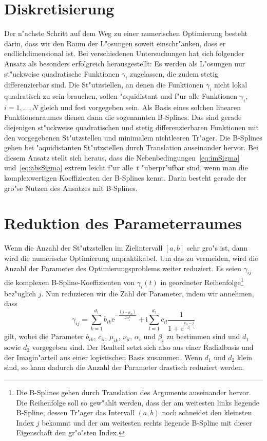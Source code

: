 \documentclass[a4paper]{scrartcl}
\newcommand{\ee}{{\mathrm{e}}}
\newcommand{\ii}{{\mathrm{i}}}
\begin{document}
\section{Diskretisierung}

Der n"achste Schritt auf dem Weg zu einer numerischen Optimierung besteht darin, dass wir den Raum der L"osungen soweit einschr"anken, dass er endlichdimensional ist. 
Bei verschiedenen Untersuchungen hat sich folgender Ansatz als besonders erfolgreich herausgestellt: 
Es werden als L"osungen nur st"uckweise quadratische Funktionen $\gamma_i$ zugelassen, die zudem stetig differenzierbar sind. 
Die St"utzstellen, an denen die Funktionen $\gamma_i$ nicht lokal quadratisch zu sein brauchen, sollen "aquidistant und f"ur alle Funktionen $\gamma_i$, $i=1,\ldots,N$ gleich und fest vorgegeben sein. 
Als Basis eines solchen linearen Funktionenraumes dienen dann die sogenannten B-Splines. 
Das sind gerade diejenigen st"uckweise quadratischen und stetig differenzierbaren Funktionen mit den vorgegebenen St"utzstellen und minimalem nichtleeren Tr"ager. 
Die B-Splines gehen bei "aquidistanten St"utzstellen durch Translation auseinander hervor. 
Bei diesem Ansatz stellt sich heraus, dass die Nebenbedingungen~\eqref{eq:imSigma} und~\eqref{eq:absSigma} extrem leicht f"ur alle~$t$ "uberpr"ufbar sind, wenn man die komplexwertigen Koeffizienten der B-Splines kennt. 
Darin besteht gerade der gro"se Nutzen des Ansatzes mit B-Splines.


\section{Reduktion des Parameterraumes}

Wenn die Anzahl der St"utzstellen im Zielintervall $[a,b]$ sehr gro"s ist, dann wird die numerische Optimierung unpraktikabel. 
Um das zu vermeiden, wird die Anzahl der Parameter des Optimierungsproblems weiter reduziert. 
Es seien $\gamma_{ij}$ die komplexen B-Spline-Koeffizienten von $\gamma_i(t)$ in geordneter Reihenfolge\footnote{Die B-Splines gehen durch Translation des Arguments auseinander hervor. Die Reihenfolge soll so gew"ahlt werden, dass der am weitesten links liegende B-Spline, dessen Tr"ager das Intervall $(a,b)$ noch schneidet den kleinsten Index $j$ bekommt und der am weitesten rechts liegende B-Spline mit dieser Eigenschaft den gr"o"sten Index.} bez"uglich $j$. Nun reduzieren wir die Zahl der Parameter, indem wir annehmen, dass 
$$ \gamma_{ij} = \sum_{k=1}^{d_1}b_{ik}\ee^{-\frac{(j-\mu_{ik})}{2\alpha_i^2}} + \ii\sum_{l=1}^{d_2}c_{il}\frac{1}{1+\ee^\frac{\nu_{il}-j}{\beta_i}} $$
gilt, wobei die Parameter $b_{ik}$, $c_{il}$, $\mu_{ik}$, $\nu_{il}$, $\alpha_i$ und $\beta_i$ zu bestimmen sind und $d_1$ sowie $d_2$ vorgegeben sind. 
Der Realteil setzt sich also aus einer Radialbasis und der Imagin"arteil aus einer logistischen Basis zusammen. 
Wenn $d_1$ und $d_2$ klein sind, so kann dadurch die Anzahl der Parameter drastisch reduziert werden. 
\end{document}
